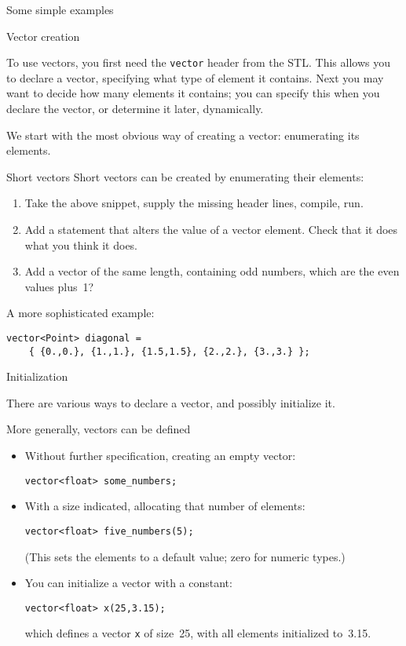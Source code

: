  {Some simple examples}

 {Vector creation}

To use vectors, you first need the \lstinline{vector} header from the \ac{STL}.
This allows you to declare a vector, specifying what type of element
it contains. Next you may want to decide how many elements it
contains; you can specify this when you declare the vector, or
determine it later, dynamically.

We start with the most obvious way of creating a vector:
enumerating its elements.

\begin{block}{Short vectors}
  \label{sl:vectorshort}
  Short vectors can be created by enumerating their elements:
  \lstset{style=snippetcode}
\end{block}

\begin{exercise}
  \label{ex:shortvectoralter}
  \begin{enumerate}
  \item
    Take the above snippet, supply the missing header lines, compile, run.
  \item Add a statement that alters the value of a vector element.
    Check that it does what you think it does.
  \item Add a vector of the same length, containing odd numbers,
    which are the even values plus~1?
  \end{enumerate}
\end{exercise}

A more sophisticated example:
\begin{lstlisting}
vector<Point> diagonal = 
    { {0.,0.}, {1.,1.}, {1.5,1.5}, {2.,2.}, {3.,3.} };
\end{lstlisting}

 {Initialization}

There are various ways to declare a vector, and possibly initialize it.

More generally, vectors can be defined
\begin{itemize}
\item Without further specification, creating an empty vector:
\begin{lstlisting}
vector<float> some_numbers;
\end{lstlisting}
\item With a size indicated, allocating that number of elements:
\begin{lstlisting}
vector<float> five_numbers(5);
\end{lstlisting}
(This sets the elements to a default value; zero for numeric types.)
\item You can initialize a vector with a constant:
\begin{lstlisting}
vector<float> x(25,3.15);
\end{lstlisting}
which defines a vector \lstinline{x} of size~25,
with all elements initialized to~3.15.
\end{itemize}

